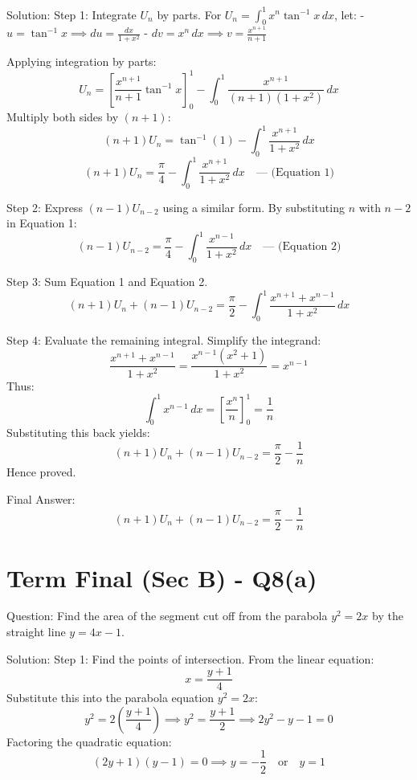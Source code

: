 \documentclass{article}
\begin{document}
Solution:
Step 1: Integrate $U_n$ by parts.
For $U_n = \int_0^1 x^n \tan^{-1} x \, dx$, let:
- $u = \tan^{-1} x \implies du = \frac{dx}{1+x^2}$
- $dv = x^n \, dx \implies v = \frac{x^{n+1}}{n+1}$

Applying integration by parts:
\[
U_n = \left[ \frac{x^{n+1}}{n+1} \tan^{-1} x \right]_0^1 - \int_0^1 \frac{x^{n+1}}{(n+1)(1+x^2)} \, dx
\]
Multiply both sides by $(n+1)$:
\[
(n+1)U_n = \tan^{-1}(1) - \int_0^1 \frac{x^{n+1}}{1+x^2} \, dx
\]
\[
(n+1)U_n = \frac{\pi}{4} - \int_0^1 \frac{x^{n+1}}{1+x^2} \, dx \quad \text{--- (Equation 1)}
\]

Step 2: Express $(n-1)U_{n-2}$ using a similar form.
By substituting $n$ with $n-2$ in Equation 1:
\[
(n-1)U_{n-2} = \frac{\pi}{4} - \int_0^1 \frac{x^{n-1}}{1+x^2} \, dx \quad \text{--- (Equation 2)}
\]

Step 3: Sum Equation 1 and Equation 2.
\[
(n+1)U_n + (n-1)U_{n-2} = \frac{\pi}{2} - \int_0^1 \frac{x^{n+1} + x^{n-1}}{1+x^2} \, dx
\]

Step 4: Evaluate the remaining integral.
Simplify the integrand:
\[
\frac{x^{n+1} + x^{n-1}}{1+x^2} = \frac{x^{n-1}(x^2+1)}{1+x^2} = x^{n-1}
\]
Thus:
\[
\int_0^1 x^{n-1} \, dx = \left[ \frac{x^n}{n} \right]_0^1 = \frac{1}{n}
\]
Substituting this back yields:
\[
(n+1)U_n + (n-1)U_{n-2} = \frac{\pi}{2} - \frac{1}{n}
\]
Hence proved.

Final Answer:
\[
\boxed{(n+1)U_n + (n-1)U_{n-2} = \frac{\pi}{2} - \frac{1}{n}}
\]

\section*{Term Final (Sec B) - Q8(a)}
Question:
Find the area of the segment cut off from the parabola $y^2 = 2x$ by the straight line $y = 4x - 1$.

Solution:
Step 1: Find the points of intersection.
From the linear equation:
\[
x = \frac{y+1}{4}
\]
Substitute this into the parabola equation $y^2 = 2x$:
\[
y^2 = 2\left(\frac{y+1}{4}\right) \implies y^2 = \frac{y+1}{2} \implies 2y^2 - y - 1 = 0
\]
Factoring the quadratic equation:
\[
(2y + 1)(y - 1) = 0 \implies y = -\frac{1}{2} \quad \text{or} \quad y = 1
\]
\end{document}
